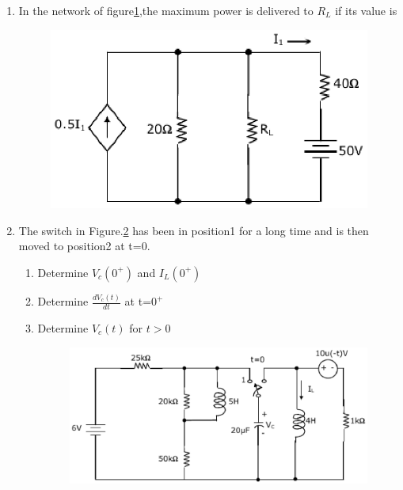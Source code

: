 \documentclass[journal,12pt,twocolumn]{IEEEtran}
\begin{document}
\begin{enumerate}
\item In the network of figure\ref{fig44},the maximum power is delivered to $R_{L}$ if its value is
\begin{enumerate}
\setlength\itemsep{2em}
\begin{figure}[!h]
\begin{center}
\includegraphics[scale=0.5]{./figs/fig44.eps}
\caption{}
\label{fig44}
\end{center}
\end{figure}
\end{enumerate}

\item The switch in Figure.\ref{fig45} has been in position1 for a long time and is then moved to
position2 at t=0.
\begin{enumerate}
\setlength\itemsep{2em}
\item Determine $V_{c}(0^{+})$ and $I_{L}(0^{+})$
\item Determine $\frac{dV_{c}(t)}{dt}$ at t=$0^{+}$
\item Determine $V_{c}(t)$ for $t>0$
\begin{figure}[!h]
\begin{center}
\includegraphics[scale=0.5]{./figs/fig45.eps}
\caption{}
\label{fig45}
\end{center}
\end{figure}
\end{enumerate}


\end{enumerate}
\end{document}
